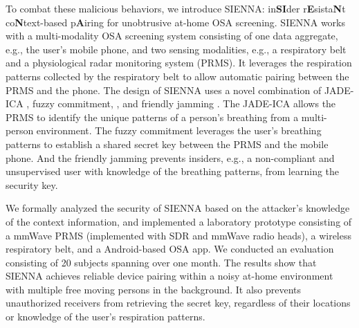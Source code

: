 
To combat these malicious behaviors, we introduce SIENNA: in\textbf{SI}der r\textbf{E}sista\textbf{N}t co\textbf{N}text-based p\textbf{A}iring for unobtrusive at-home OSA screening. SIENNA works with a multi-modality OSA screening system consisting of one data aggregate, e.g., the user's mobile phone, and two sensing modalities, e.g.,  a respiratory belt and a physiological radar monitoring system (PRMS). It leverages the respiration patterns collected by the respiratory belt to allow automatic pairing between the PRMS and the phone. The design of SIENNA uses a novel combination of JADE-ICA \cite{rutledge_independent_2013}, fuzzy commitment, \cite{JuelsFuzzyCommitmentScheme1999}, and friendly jamming \cite{AroraDialogCodesSecure2009,GollakotaPhysicalLayerWireless2011, MelcherIJamChannelRandomization2020}. The JADE-ICA allows the PRMS to identify the unique patterns of a person's breathing from a multi-person environment. The fuzzy commitment leverages the user's breathing patterns to establish a shared secret key between the PRMS and the mobile phone. And the friendly jamming prevents insiders, e.g., a non-compliant and unsupervised user with knowledge of the breathing patterns, from learning the security key.

We formally analyzed the security of SIENNA based on the attacker's knowledge of the context information, and implemented a laboratory prototype consisting of a mmWave PRMS (implemented with SDR and mmWave radio heads), a wireless respiratory belt, and a Android-based OSA app. We conducted an evaluation consisting of 20 subjects spanning over one month. The results show that SIENNA achieves reliable device pairing within a noisy at-home environment with multiple free moving persons in the background. It also prevents unauthorized receivers from retrieving the secret key, regardless of their locations or knowledge of the user's respiration patterns.